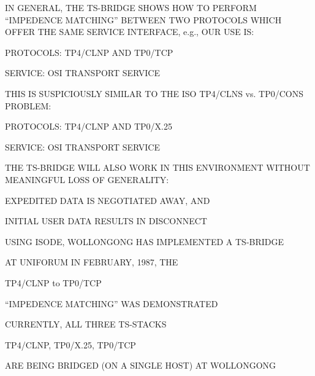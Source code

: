 \begin{bwslide}

\begin{nrtc}
\item	IN GENERAL, THE TS-BRIDGE SHOWS HOW TO PERFORM
	``IMPEDENCE MATCHING'' BETWEEN TWO PROTOCOLS WHICH OFFER THE
	SAME SERVICE INTERFACE, e.g., OUR USE IS:
    \begin{nrtc}
    \item	PROTOCOLS: TP4/CLNP AND TP0/TCP

    \item	SERVICE: OSI TRANSPORT SERVICE
    \end{nrtc}

\item	THIS IS SUSPICIOUSLY SIMILAR TO THE ISO TP4/CLNS vs. TP0/CONS PROBLEM:
    \begin{nrtc}
    \item	PROTOCOLS: TP4/CLNP AND TP0/X.25

    \item	SERVICE: OSI TRANSPORT SERVICE
    \end{nrtc}

\item	THE TS-BRIDGE WILL ALSO WORK IN THIS ENVIRONMENT WITHOUT
	MEANINGFUL LOSS OF GENERALITY:
    \begin{nrtc}
    \item	EXPEDITED DATA IS NEGOTIATED AWAY, AND

    \item	INITIAL USER DATA RESULTS IN DISCONNECT
    \end{nrtc}
\end{nrtc}
\end{bwslide}


\begin{bwslide}

\begin{nrtc}
\item	USING ISODE, WOLLONGONG HAS IMPLEMENTED A TS-BRIDGE

\item	AT UNIFORUM IN FEBRUARY, 1987, THE
    \begin{nrtc}
    \item	TP4/CLNP to TP0/TCP
    \end{nrtc}
    ``IMPEDENCE MATCHING'' WAS DEMONSTRATED

\item	CURRENTLY, ALL THREE TS-STACKS
    \begin{nrtc}
    \item	TP4/CLNP, TP0/X.25, TP0/TCP
    \end{nrtc}
    ARE BEING BRIDGED (ON A SINGLE HOST) AT WOLLONGONG
\end{nrtc}
\end{bwslide}


